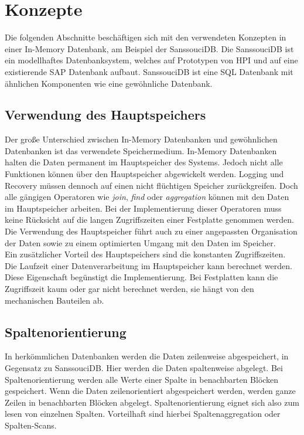 \documentclass[draft,final]{vutinfth} %
\begin{document}
\section{Konzepte}
Die folgenden Abschnitte beschäftigen sich mit den verwendeten Konzepten in einer In-Memory Datenbank, am Beispiel der SanssouciDB. Die SanssouciDB ist ein modellhaftes Datenbanksystem, welches auf Prototypen von HPI und auf eine existierende SAP Datenbank aufbaut. SanssouciDB ist eine SQL Datenbank mit ähnlichen Komponenten wie eine gewöhnliche Datenbank.

\subsection{Verwendung des Hauptspeichers}
Der gro\ss e Unterschied zwischen In-Memory Datenbanken und gewöhnlichen Datenbanken ist das verwendete Speichermedium. In-Memory Datenbanken halten die Daten permanent im Hauptspeicher des Systems. Jedoch nicht alle Funktionen können über den Hauptspeicher abgewickelt werden. Logging und Recovery müssen dennoch auf einen nicht flüchtigen Speicher zurückgreifen. Doch alle gängigen Operatoren wie \textit{join}, \textit{find} oder \textit{aggregation} können mit den Daten im Hauptspeicher arbeiten. Bei der Implementierung dieser Operatoren muss keine Rücksicht auf die langen Zugriffszeiten einer Festplatte genommen werden. Die Verwendung des Hauptspeicher führt auch zu einer angepassten Organisation der Daten sowie zu einem optimierten Umgang mit den Daten im Speicher. \\
Ein zusätzlicher Vorteil des Hauptspeichers sind die konstanten Zugriffszeiten. Die Laufzeit einer Datenverarbeitung im Hauptspeicher kann berechnet werden. Diese Eigenschaft begünstigt die Implementierung. Bei Festplatten kann die Zugriffszeit kaum oder gar nicht berechnet werden, sie hängt von den mechanischen Bauteilen ab.

\subsection{Spaltenorientierung}
In herkömmlichen Datenbanken werden die Daten zeilenweise abgespeichert, in Gegensatz zu SanssouciDB. Hier werden die Daten spaltenweise abgelegt. Bei Spaltenorientierung werden alle Werte einer Spalte in benachbarten Blöcken gespeichert. Wenn die Daten zeilenorientiert abgespeichert werden, werden ganze Zeilen in benachbarten Blöcken abgelegt. Spaltenorientierung eignet sich also zum lesen von einzelnen Spalten. Vorteilhaft sind hierbei Spaltenaggregation oder Spalten-Scans.
\end{document}
